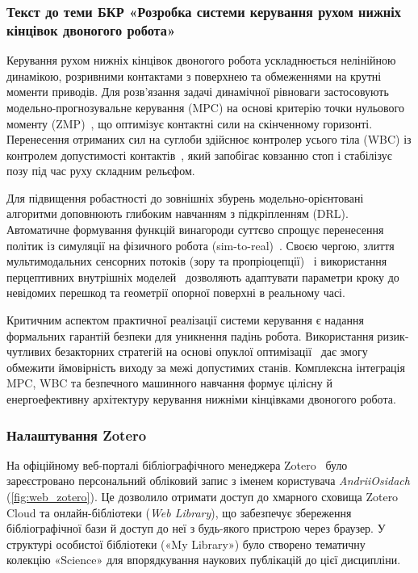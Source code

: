 \documentclass{article}
\begin{document}
\subsubsection{Текст до теми БКР «Розробка системи керування рухом нижніх кінцівок двоногого робота»}

Керування рухом нижніх кінцівок двоногого робота ускладнюється нелінійною динамікою, розривними контактами з поверхнею та обмеженнями на крутні моменти приводів. Для розв'язання задачі динамічної рівноваги застосовують модельно-прогнозувальне керування (MPC) на основі критерію точки нульового моменту (ZMP)~\cite{xuZMPAwareTaskFormulation2026}, що оптимізує контактні сили на скінченному горизонті. Перенесення отриманих сил на суглоби здійснює контролер усього тіла (WBC) із контролем допустимості контактів~\cite{zhangFeasibilityawareWholebodyControl2026}, який запобігає ковзанню стоп і стабілізує позу під час руху складним рельєфом.

Для підвищення робастності до зовнішніх збурень модельно-орієнтовані алгоритми доповнюють глибоким навчанням з підкріпленням (DRL). Автоматичне формування функцій винагороди суттєво спрощує перенесення політик із симуляції на фізичного робота (sim-to-real)~\cite{luDeepReinforcementLearning2026}. Своєю чергою, злиття мультимодальних сенсорних потоків (зору та пропріоцепції)~\cite{jiLearningbasedLocomotionControl2025} і використання перцептивних внутрішніх моделей~\cite{longLearningHumanoidLocomotion2025} дозволяють адаптувати параметри кроку до невідомих перешкод та геометрії опорної поверхні в реальному часі.

Критичним аспектом практичної реалізації системи керування є надання формальних гарантій безпеки для уникнення падінь робота. Використання ризик-чутливих безакторних стратегій на основі опуклої оптимізації~\cite{zhangRisksensitiveActorfreePolicy2023} дає змогу обмежити ймовірність виходу за межі допустимих станів. Комплексна інтеграція MPC, WBC та безпечного машинного навчання формує цілісну й енергоефективну архітектуру керування нижніми кінцівками двоногого робота.

\subsubsection{Налаштування Zotero}
На офіційному веб-порталі бібліографічного менеджера Zotero~\cite{zotero} було зареєстровано персональний обліковий запис з іменем користувача \textit{AndriiOsidach} (\cref{fig:web_zotero}). Це дозволило отримати доступ до хмарного сховища Zotero Cloud та онлайн-бібліотеки (\textit{Web Library}), що забезпечує збереження бібліографічної бази й доступ до неї з будь-якого пристрою через браузер. У структурі особистої бібліотеки («My Library») було створено тематичну колекцію «Science» для впорядкування наукових публікацій до цієї дисципліни.
\end{document}

